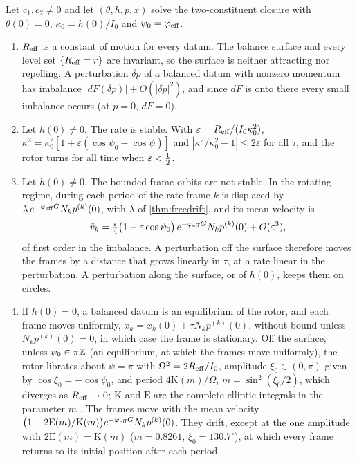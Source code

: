 \begin{theorem}
\label{e5:thm:stab}
Let $c_1,c_2\neq0$ and let $(\theta,h,p,x)$ solve the two-constituent closure with $\theta(0)=0$, $\kappa_0=h(0)/I_0$ and $\psi_0=\varphi_{\rm eff}$.
\begin{enumerate}[label=(\roman*),leftmargin=2.2em]
\item $R_{\rm eff}$ is a constant of motion for every datum. The balance surface and every level set $\{R_{\rm eff}=r\}$ are invariant, so the
surface is neither attracting nor repelling. A perturbation $\delta p$ of a balanced datum with nonzero momentum has imbalance $|dF(\delta p)|+O(|\delta p|^2)$, and
since $dF$ is onto there every small imbalance occurs (at $p=0$, $dF=0$).
\item Let $h(0)\neq0$. The rate is stable. With $\varepsilon=R_{\rm eff}/(I_0\kappa_0^2)$, $\kappa^2=\kappa_0^2[1+\varepsilon(\cos\psi_0-\cos\psi)]$ and
$|\kappa^2/\kappa_0^2-1|\le2\varepsilon$ for all $\tau$, and the rotor turns for all time when $\varepsilon<\tfrac12$.
\item Let $h(0)\neq0$. The bounded frame orbits are not stable. In the rotating regime, during each period of the rate frame $k$ is displaced by
$\lambda\,e^{-\varphi_{\rm eff}G}N_kp^{(k)}(0)$, with $\lambda$ of \cref{thm:freedrift}, and its mean velocity is
\[
\bar v_k=\tfrac\varepsilon4\bigl(1-\varepsilon\cos\psi_0\bigr)\,e^{-\varphi_{\rm eff}G}N_kp^{(k)}(0)+O(\varepsilon^3),
\]
of first order in the imbalance. A perturbation off the surface therefore moves the frames by a distance that grows linearly in $\tau$, at a rate linear
in the perturbation. A perturbation along the surface, or of $h(0)$, keeps them on circles.
\item If $h(0)=0$, a balanced datum is an equilibrium of the rotor, and each frame moves uniformly, $x_k=x_k(0)+\tau N_kp^{(k)}(0)$, without bound unless
$N_kp^{(k)}(0)=0$, in which case the frame is stationary.
Off the surface, unless $\psi_0\in\pi\mathbb{Z}$ (an equilibrium, at which the frames move uniformly), the rotor librates about $\psi=\pi$ with
$\Omega^2=2R_{\rm eff}/I_0$, amplitude $\xi_0\in(0,\pi)$ given by $\cos\xi_0=-\cos\psi_0$, and period $4\mathrm K(m)/\Omega$, $m=\sin^2(\xi_0/2)$,
which diverges as $R_{\rm eff}\to0$; $\mathrm K$ and $\mathrm E$ are the complete elliptic integrals in the parameter $m$ \cite{DLMF}. The
frames move with the mean velocity $\bigl(1-2\mathrm E(m)/\mathrm K(m)\bigr)e^{-\varphi_{\rm eff}G}N_kp^{(k)}(0)$. They drift, except at the one
amplitude with $2\mathrm E(m)=\mathrm K(m)$ ($m=0.8261$, $\xi_0=130.7^\circ$), at which every frame returns to its initial position after each
period.
\end{enumerate}
\end{theorem}

